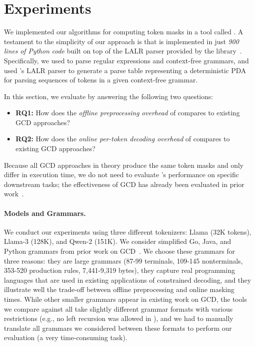 \section{Experiments}\label{sec:eval}



We implemented our algorithms for computing token masks in a tool called \name. 
% 
A testament to the simplicity of our approach is that \name is implemented in just \textit{900 lines of Python code} built on top of the LALR parser provided by the  library~\cite{lark}.
% 
Specifically, we used  to parse regular expressions and context-free grammars, and used 's LALR parser to generate a parse table representing a deterministic PDA for parsing sequences of tokens in a given context-free grammar. 

In this section, we evaluate \name by answering the following
two questions:
\begin{itemize}
    \item \textbf{RQ1:} How does the \textit{offline preprocessing overhead} of \name compares to existing GCD approaches?
    \item \textbf{RQ2:} How does the \textit{online per-token decoding overhead} of \name compares to existing GCD approaches?
\end{itemize}
Because all GCD approaches in theory produce the same token masks and only differ in execution time, we do not need to evaluate \name's performance on specific downstream tasks; the effectiveness of GCD has already been evaluated in prior work~\cite{geng2024grammarconstrained,beurer2024domino,gad2024}.

\paragraph{Models and Grammars.}
We conduct our experiments using
three different tokenizers: Llama (32K tokens), Llama-3 (128K), and Qwen-2 (151K).
% 
We consider simplified Go, Java, and Python grammars from prior work on GCD~\cite{ugare2024syncode}.
% 
We choose these grammars for three reasons: they are large grammars (87-99 terminals, 109-145 nonterminals, 353-520 production rules, 7,441-9,319 bytes), they capture real programming languages that are used in existing applications of constrained decoding, and they illustrate well the trade-off between offline preprocessing and online masking times.
% 
While other smaller grammars appear in existing work on GCD, the tools we compare against all take slightly different grammar formats with various restrictions (e.g., no left recursion was allowed in \xgrammar), and we had to manually translate all grammars we considered between these formats to perform our evaluation (a very time-consuming task).

